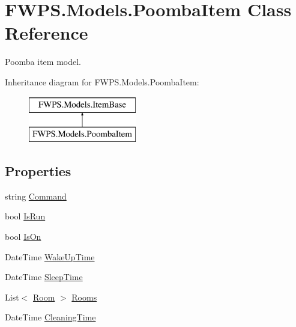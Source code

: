 \hypertarget{class_f_w_p_s_1_1_models_1_1_poomba_item}{}\section{F\+W\+P\+S.\+Models.\+Poomba\+Item Class Reference}
\label{class_f_w_p_s_1_1_models_1_1_poomba_item}


Poomba item model.  


Inheritance diagram for F\+W\+P\+S.\+Models.\+Poomba\+Item\+:\begin{figure}[H]
\begin{center}
\leavevmode
\includegraphics[height=2.000000cm]{class_f_w_p_s_1_1_models_1_1_poomba_item}
\end{center}
\end{figure}
\subsection*{Properties}
\begin{DoxyCompactItemize}
\item 
string \mbox{\hyperlink{class_f_w_p_s_1_1_models_1_1_poomba_item_a462ac5b78c4927a3d322085aa75f9549}{Command}}
\item 
bool \mbox{\hyperlink{class_f_w_p_s_1_1_models_1_1_poomba_item_a012cb7185b257c7aeccdbecb2b12386c}{Is\+Run}}
\item 
bool \mbox{\hyperlink{class_f_w_p_s_1_1_models_1_1_poomba_item_aaa1d2634c4113a06accdeea65168f575}{Is\+On}}
\item 
Date\+Time \mbox{\hyperlink{class_f_w_p_s_1_1_models_1_1_poomba_item_a59508eafd422e3a407038e32b0bd73e9}{Wake\+Up\+Time}}
\item 
Date\+Time \mbox{\hyperlink{class_f_w_p_s_1_1_models_1_1_poomba_item_adbf2f8b487450c2949cd3f3093841b2c}{Sleep\+Time}}
\item 
List$<$ \mbox{\hyperlink{class_f_w_p_s_1_1_models_1_1_room}{Room}} $>$ \mbox{\hyperlink{class_f_w_p_s_1_1_models_1_1_poomba_item_ae910d70f4ab6a2639d92b81ea0d12e9f}{Rooms}}
\item 
Date\+Time \mbox{\hyperlink{class_f_w_p_s_1_1_models_1_1_poomba_item_ace2bdda9089feb574469394db7d6cb6c}{Cleaning\+Time}}
\end{DoxyCompactItemize}
